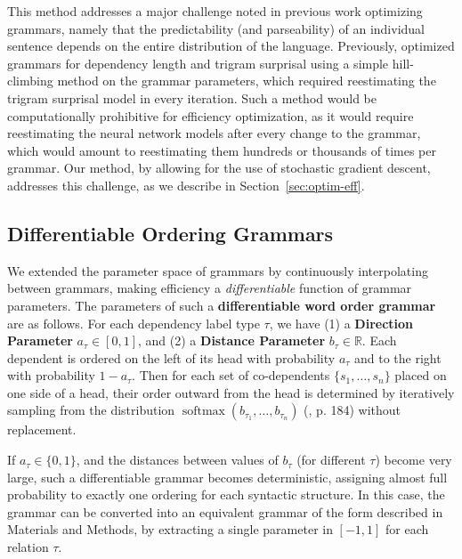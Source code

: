 \documentclass[10pt,twoside,lineno]{article}
\newcommand{\key}[1]{\textbf{#1}}
\begin{document}
This method addresses a major challenge noted in previous work optimizing grammars, namely that the predictability (and parseability) of an individual sentence depends on the entire distribution of the language.
Previously, \citet{gildea2015human} optimized grammars for dependency length and trigram surprisal using a simple hill-climbing method on the grammar parameters, which required reestimating the trigram surprisal model in every iteration.
Such a method would be computationally prohibitive for efficiency optimization, as it would require reestimating the neural network models after every change to the grammar, which would amount to reestimating them hundreds or thousands of times per grammar.
Our method, by allowing for the use of stochastic gradient descent, addresses this challenge, as we describe in Section~\ref{sec:optim-eff}.


\subsection{Differentiable Ordering Grammars}\label{sec:diff-gramm}

We extended the parameter space of grammars by continuously interpolating between grammars, making efficiency a \emph{differentiable} function of grammar parameters.
The parameters of such a \key{differentiable word order grammar} are as follows. 
For each dependency label type $\tau$, we have (1) a \key{Direction Parameter} $a_\tau \in [0,1]$, and (2) a \key{Distance Parameter} $b_\tau \in \mathbb{R}$. 
Each dependent is ordered on the left of its head with probability $a_\tau$ and to the right with probability $1-a_\tau$. 
Then for each set of co-dependents $\{s_1, \dots , s_n\}$ placed on one side of a head, their order outward from the head is determined by iteratively sampling from the distribution $\operatorname{softmax}(b_{\tau_1}, \dots, b_{\tau_n})$ (\cite{goodfellow2016deep}, p. 184) without replacement. 

If $a_\tau \in \{0, 1\}$, and the distances between values of $b_\tau$ (for different $\tau$) become very large, such a differentiable grammar becomes deterministic, assigning almost full probability to exactly one ordering for each syntactic structure.
In this case, the grammar can be converted into an equivalent grammar of the form described in Materials and Methods, by extracting a single parameter in $[-1, 1]$ for each relation $\tau$.
\end{document}

